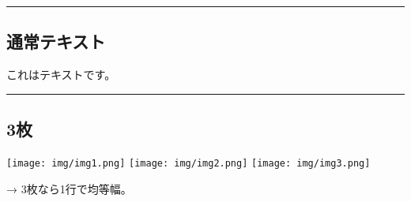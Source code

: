 \documentclass[
]{article}
\begin{document}
\begin{center}\rule{0.5\linewidth}{0.5pt}\end{center}

\subsection{通常テキスト}\label{ux901aux5e38ux30c6ux30adux30b9ux30c8}

これはテキストです。

\begin{center}\rule{0.5\linewidth}{0.5pt}\end{center}

\subsection{3枚}\label{ux679a}

\begin{center}
\texttt{[image: img/img1.png]}
\texttt{[image: img/img2.png]}
\texttt{[image: img/img3.png]}
\end{center}

→ 3枚なら1行で均等幅。
\end{document}
